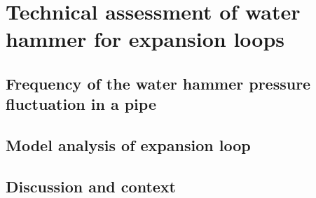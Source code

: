 \section{Technical assessment of water hammer for expansion loops}
\subsection{Frequency of the water hammer pressure fluctuation in a pipe}
\subsection{Model analysis of expansion loop}
\subsection{Discussion and context}